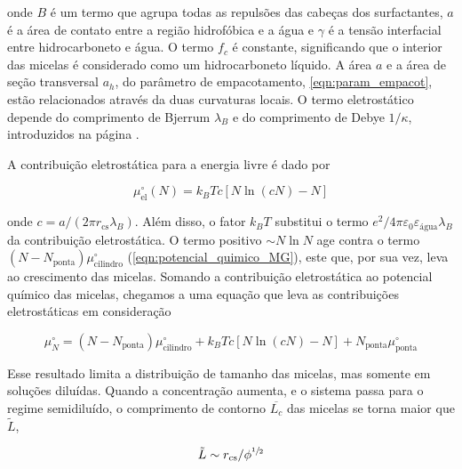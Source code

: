 		\noindent onde \(B\) é um termo que agrupa todas as repulsões das cabeças dos surfactantes, \(a\) é a área de contato entre a região hidrofóbica e a água e \(\gamma\) é a tensão interfacial entre hidrocarboneto e água. O termo \(f_c\) é constante, significando que o interior das micelas é considerado como um hidrocarboneto líquido. A área \(a\) e a área de seção transversal \(a_h\), do parâmetro de empacotamento, \autoref{eqn:param_empacot}, estão relacionados através da duas curvaturas locais. O termo eletrostático depende do comprimento de Bjerrum \(\lambda_B\) e do comprimento de Debye \(1/\kappa\), introduzidos na página \pageref{eqn:comprimento_debye}.
		
		A contribuição eletrostática para a energia livre é dado por \cite{Giant_Micelles}
		
		\begin{equation}
			\mu_\mathrm{el}^\circ (N) = k_B T c \left[ N \ln (cN) - N \right]
			\label{eqn:potencial_quim_eletrostatico}
		\end{equation} 
		
		\noindent onde \(c = a / (2 \pi r_\mathrm{cs} \lambda_B)\). Além disso, o fator \(k_BT\) substitui o termo \(e^2/4\pi\varepsilon_{ 0 }\varepsilon_\mathrm{água}\lambda_B\) da contribuição eletrostática. O termo positivo \(\sim N \ln N\) age contra o termo \((N - N_\mathrm{ponta}) \mu_\mathrm{cilindro}^\circ\) (\autoref{eqn:potencial_quimico_MG}), este que, por sua vez, leva ao crescimento das micelas. Somando a contribuição eletrostática ao potencial químico das micelas, chegamos a uma equação que leva as contribuições eletrostáticas em consideração \cite{Giant_Micelles}
		
		\begin{equation}
			\mu_N^\circ = (N - N_\mathrm{ponta})\mu_\mathrm{cilindro}^\circ + k_B T c \left[ N \ln (cN) - N \right] + N_\mathrm{ponta}\mu_\mathrm{ponta}^\circ
		\end{equation}
		
		Esse resultado limita a distribuição de tamanho das micelas, mas somente em soluções diluídas. Quando a concentração aumenta, e o sistema passa para o regime semidiluído, o comprimento de contorno \(\overline{L_c}\) das micelas se torna maior que \(\tilde{L}\), 
		
		\begin{equation}
		 	\tilde{L} \sim r_\mathrm{cs} / \phi^{\sfrac{1}{2}}
		\end{equation}
		
